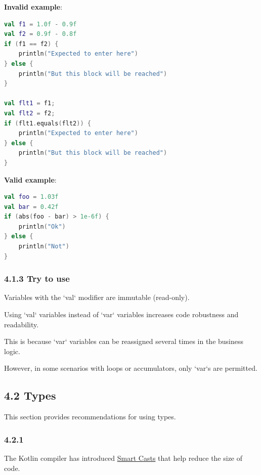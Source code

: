 {{{{\textbf{Invalid example}:

\begin{lstlisting}[language=Kotlin]
val f1 = 1.0f - 0.9f
val f2 = 0.9f - 0.8f
if (f1 == f2) {
    println("Expected to enter here")
} else {
    println("But this block will be reached")
}

val flt1 = f1;
val flt2 = f2;
if (flt1.equals(flt2)) {
    println("Expected to enter here")
} else {
    println("But this block will be reached")
} 
\end{lstlisting}


\textbf{Valid example}:



\begin{lstlisting}[language=Kotlin]
val foo = 1.03f
val bar = 0.42f
if (abs(foo - bar) > 1e-6f) {
    println("Ok")
} else {
    println("Not")
}
\end{lstlisting}


\subsubsection*{\textbf{4.1.3 Try to use}}
\leavevmode\newline



Variables with the `val` modifier are immutable (read-only).

Using `val` variables instead of `var` variables increases code robustness and readability.

This is because `var` variables can be reassigned several times in the business logic.

However, in some scenarios with loops or accumulators, only `var`s are permitted.



\subsection*{\textbf{4.2 Types}}

This section provides recommendations for using types.

\subsubsection*{\textbf{4.2.1}}
\leavevmode\newline



The Kotlin compiler has introduced \href{https://kotlinlang.org/docs/reference/typecasts.html#smart-casts}{Smart Casts} that help reduce the size of code.



}}}}
